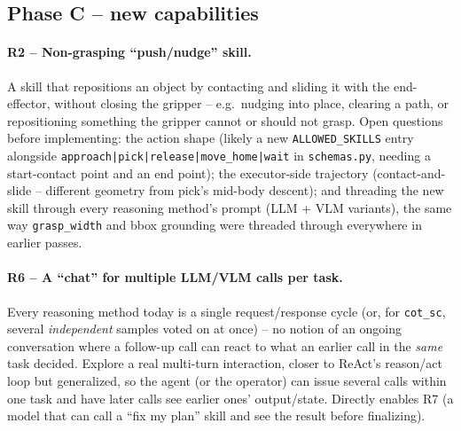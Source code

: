 \subsection{Phase C -- new capabilities}

\paragraph{R2 -- Non-grasping ``push/nudge'' skill.} A skill that
repositions an object by contacting and sliding it with the end-effector,
without closing the gripper -- e.g.\ nudging into place, clearing a path, or
repositioning something the gripper cannot or should not grasp. Open
questions before implementing: the action shape (likely a new
\texttt{ALLOWED\_SKILLS} entry alongside
\texttt{approach|pick|release|move\_home|wait} in \texttt{schemas.py}, needing
a start-contact point and an end point); the executor-side trajectory
(contact-and-slide -- different geometry from pick's mid-body descent); and
threading the new skill through every reasoning method's prompt (LLM + VLM
variants), the same way \texttt{grasp\_width} and bbox grounding were
threaded through everywhere in earlier passes.

\paragraph{R6 -- A ``chat'' for multiple LLM/VLM calls per task.} Every
reasoning method today is a single request/response cycle (or, for
\texttt{cot\_sc}, several \emph{independent} samples voted on at once) -- no
notion of an ongoing conversation where a follow-up call can react to what
an earlier call in the \emph{same} task decided. Explore a real multi-turn
interaction, closer to ReAct's reason/act loop but generalized, so the agent
(or the operator) can issue several calls within one task and have later
calls see earlier ones' output/state. Directly enables R7 (a model that can
call a ``fix my plan'' skill and see the result before finalizing).

